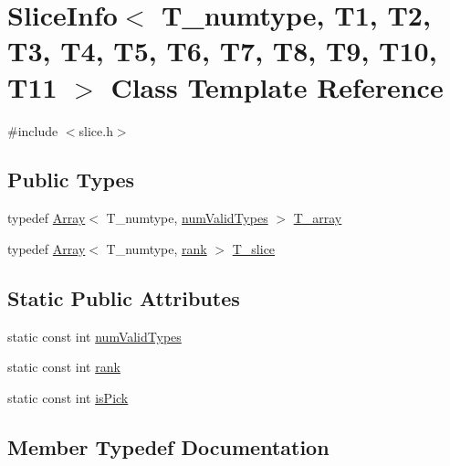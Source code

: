 \hypertarget{classSliceInfo}{}\section{Slice\+Info$<$ T\+\_\+numtype, T1, T2, T3, T4, T5, T6, T7, T8, T9, T10, T11 $>$ Class Template Reference}
\label{classSliceInfo}


{\ttfamily \#include $<$slice.\+h$>$}

\subsection*{Public Types}
\begin{DoxyCompactItemize}
\item 
typedef \hyperlink{classArray}{Array}$<$ T\+\_\+numtype, \hyperlink{classSliceInfo_acab30466f2e1e0506c1a9caddc18dd5f}{num\+Valid\+Types} $>$ \hyperlink{classSliceInfo_a4b4e488c55e60568f80f246e97ab8b65}{T\+\_\+array}
\item 
typedef \hyperlink{classArray}{Array}$<$ T\+\_\+numtype, \hyperlink{classSliceInfo_ae103c298c90e60cea21b2f01b088d374}{rank} $>$ \hyperlink{classSliceInfo_a6e50b9cc2f3ab62b8d3c8b59f86a2037}{T\+\_\+slice}
\end{DoxyCompactItemize}
\subsection*{Static Public Attributes}
\begin{DoxyCompactItemize}
\item 
static const int \hyperlink{classSliceInfo_acab30466f2e1e0506c1a9caddc18dd5f}{num\+Valid\+Types}
\item 
static const int \hyperlink{classSliceInfo_ae103c298c90e60cea21b2f01b088d374}{rank}
\item 
static const int \hyperlink{classSliceInfo_ae58323255323aec3392d4ef776060173}{is\+Pick}
\end{DoxyCompactItemize}


\subsection{Member Typedef Documentation}
\hypertarget{classSliceInfo_a4b4e488c55e60568f80f246e97ab8b65}{}
